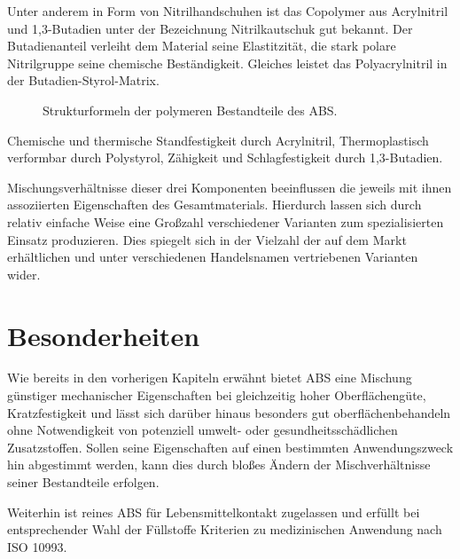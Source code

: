             Unter anderem in Form von Nitrilhandschuhen ist das Copolymer aus Acrylnitril und
            1,3-Butadien unter der Bezeichnung Nitrilkautschuk gut bekannt. Der Butadienanteil verleiht dem Material seine Elastitzität,
            die stark polare Nitrilgruppe seine chemische Beständigkeit. Gleiches leistet das Polyacrylnitril in der Butadien-Styrol-Matrix.
            \begin{figure}[H]%
                \centering
                \qquad
                \qquad
                \caption[Strukturformeln der polymeren Bestandteile des ABS]{Strukturformeln der polymeren Bestandteile des ABS.}%
                \label{fig:strukturformeln polymere}%
            \end{figure}
            Chemische und thermische Standfestigkeit durch Acrylnitril, Thermoplastisch verformbar durch Polystyrol, Zähigkeit
            und Schlagfestigkeit durch 1,3-Butadien.
            
            Mischungsverhältnisse dieser drei Komponenten beeinflussen die jeweils mit ihnen assoziierten Eigenschaften des
            Gesamtmaterials. Hierdurch lassen sich durch relativ einfache Weise eine Großzahl verschiedener Varianten zum
            spezialisierten Einsatz produzieren. Dies spiegelt sich in der Vielzahl der auf dem Markt erhältlichen und unter
            verschiedenen Handelsnamen vertriebenen Varianten wider.

    \section{Besonderheiten}
            Wie bereits in den vorherigen Kapiteln erwähnt bietet ABS eine Mischung günstiger mechanischer Eigenschaften
            bei gleichzeitig hoher Oberflächengüte, Kratzfestigkeit und lässt sich darüber hinaus besonders gut oberflächenbehandeln
            ohne  Notwendigkeit von potenziell umwelt- oder gesundheitsschädlichen Zusatzstoffen. Sollen seine
            Eigenschaften auf einen bestimmten Anwendungszweck hin abgestimmt werden, kann dies durch bloßes Ändern der
            Mischverhältnisse seiner Bestandteile erfolgen.

            Weiterhin ist reines ABS für Lebensmittelkontakt zugelassen und erfüllt bei entsprechender Wahl der Füllstoffe
            Kriterien zu medizinischen Anwendung nach ISO 10993\cite{ABS.M30i.Datasheet.Stratasys.20210210}.